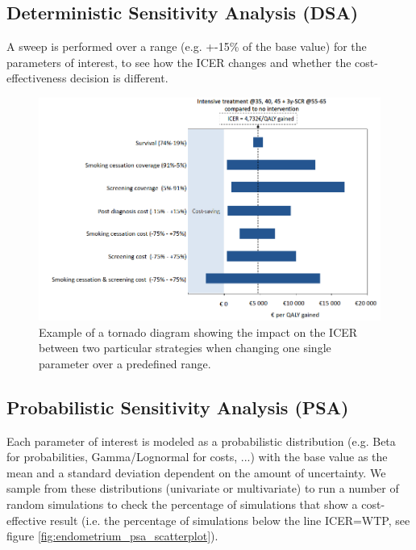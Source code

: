 \subsection{Deterministic Sensitivity Analysis (DSA)}
A sweep is performed over a range (e.g. +-15\% of the base value) for the parameters of interest, to see how the ICER changes and whether the cost-effectiveness decision is different.

\begin{figure}[h]
	\centering
	\includegraphics[width=\textwidth]{figures/lung_tornado}
	\decoRule
	\caption[Tornado diagram example]{Example of a tornado diagram showing the impact on the ICER between two particular strategies when changing one single parameter over a predefined range.}
	\label{fig:lung_tornado}
\end{figure}

\subsection{Probabilistic Sensitivity Analysis (PSA)}
Each parameter of interest is modeled as a probabilistic distribution (e.g. Beta for probabilities, Gamma/Lognormal for costs, ...) with the base value as the mean and a standard deviation dependent on the amount of uncertainty. We sample from these distributions (univariate or multivariate) to run a number of random simulations to check the percentage of simulations that show a cost-effective result (i.e. the percentage of simulations below the line ICER=WTP, see figure \ref{fig:endometrium_psa_scatterplot}).

